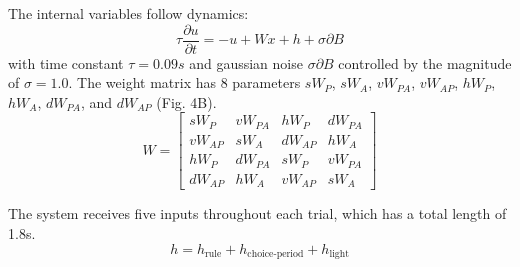 \documentclass[11pt]{article}
\begin{document}
 The internal variables follow dynamics:
\begin{equation}
\tau \frac{\partial u}{\partial t} = -u + Wx + h + \sigma \partial B
\end{equation}
with time constant $\tau = 0.09s$ and gaussian noise $\sigma \partial B$ controlled by the magnitude of $\sigma=1.0$.  The weight matrix has 8 parameters $sW_P$, $sW_A$, $vW_{PA}$, $vW_{AP}$, $hW_P$, $hW_A$, $dW_{PA}$, and $dW_{AP}$ (Fig. 4B).
\begin{equation}
W = \begin{bmatrix} sW_P & vW_{PA} & hW_P & dW_{PA}  \\ vW_{AP}  & sW_A & dW_{AP}  & hW_A \\ hW_P & dW_{PA}  & sW_P & vW_{PA}  \\ dW_{AP}  & hW_A & vW_{AP}  & sW_A \end{bmatrix}
\end{equation}

The system receives five inputs throughout each trial, which has a total length of 1.8s.
\begin{equation}
h = h_{\text{rule}} + h_{\text{choice-period}} + h_{\text{light}}
\end{equation}
\end{document}

